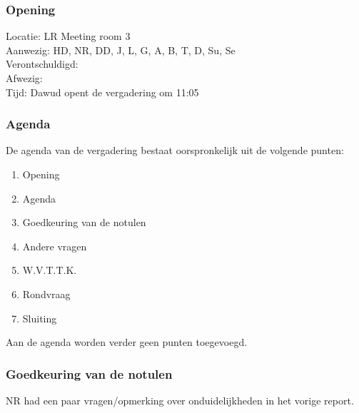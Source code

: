 \subsubsection{Opening}
Locatie: LR Meeting room 3\\
Aanwezig: HD, NR, DD, J, L, G, A, B, T, D, Su, Se\\
Verontschuldigd: \\
Afwezig: \\
Tijd: Dawud opent de vergadering om 11:05\\

\subsubsection{Agenda}
De agenda van de vergadering bestaat oorspronkelijk uit de volgende punten:
\begin{enumerate}
\item Opening
\item Agenda
\item Goedkeuring van de notulen
\item Andere vragen
\item W.V.T.T.K.
\item Rondvraag
\item Sluiting
\end{enumerate}

Aan de agenda worden verder geen punten toegevoegd.

\subsubsection{Goedkeuring van de notulen}
NR had een paar vragen/opmerking over onduidelijkheden in het vorige report.

